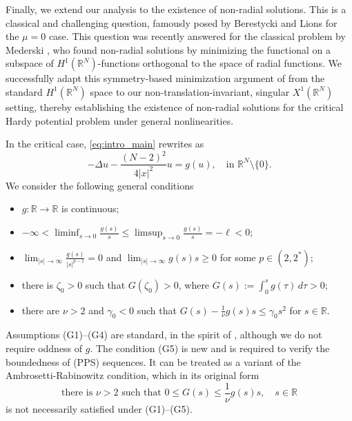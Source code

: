 \documentclass[12pt,leqno,twoside,sort]{amsart}
\newcommand{\R}{\mathbb{R}}
\numberwithin{equation}{section}
\begin{document}
Finally, we extend our analysis to the existence of non-radial solutions. This is a classical and challenging question, famously posed by Berestycki and Lions \cite{BL} for the $\mu=0$ case. This question was recently answered for the classical problem by Mederski \cite{MR4173560}, who found non-radial solutions by minimizing the functional on a subspace of $H^1(\R^N)$-functions orthogonal to the space of radial functions. We successfully adapt this symmetry-based minimization argument of \cite{MR4173560} from the standard $H^1(\R^N)$ space to our non-translation-invariant, singular $X^1(\R^N)$ setting, thereby establishing the existence of non-radial solutions for the critical Hardy potential problem under general nonlinearities.


In the critical case, \eqref{eq:intro_main} rewrites as
\begin{equation}\label{eq:main}
-\Delta u - \frac{(N-2)^2}{4|x|^2} u  = g(u),  \quad \mbox{in } \R^N \setminus \{0\}.
\end{equation}
We consider the following general conditions
\begin{itemize}
\item[(G1)] $g : \R \rightarrow \R$ is continuous;
\item[(G2)] $-\infty < \liminf_{s \to 0}  \frac{g(s)}{s} \leq \limsup_{s \to 0} \frac{g(s)}{s} = -\ell < 0$;
\item[(G3)] $\lim_{|s| \to \infty} \frac{g(s)}{|s|^{p-1}} = 0$ and $\lim_{|s| \to \infty} g(s)s \geq 0$ for some $p \in \left( 2,2^* \right)$;
\item[(G4)] there is $\zeta_0 > 0$ such that $G(\zeta_0) > 0$, where $G(s) := \int_0^{s} g(\tau) \, d\tau > 0$;
\item[(G5)] there are $\nu > 2$ and $\gamma_0 < 0$ such that
$G(s) - \frac{1}{\nu} g(s)s \leq \gamma_0 s^2$ for $s\in\R$.
\end{itemize}

Assumptions (G1)--(G4) are standard, in the spirit of \cite{BL}, although we do not require oddness of $g$. The condition (G5) is new and is required to verify the boundedness of (PPS) sequences. It can be treated as a variant of the Ambrosetti-Rabinowitz condition, which in its original form
\begin{equation}\tag{AR}\label{AR}
\mbox{there is } \nu > 2 \mbox{ such that } 0 \leq G(s) \leq \frac{1}{\nu} g(s)s, \quad s \in \R
\end{equation}
is not necessarily satisfied under (G1)--(G5).
\end{document}
